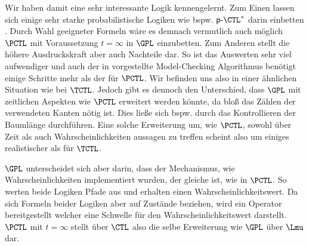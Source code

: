 Wir haben damit eine sehr interessante Logik kennengelernt.
Zum Einen lassen sich einige sehr starke probabilistische Logiken wie bspw. $\mathsf{p}\text{-}\CTL^*$ darin einbetten \cite{cleaveland2005probabilistic}.
Durch Wahl geeigneter Formeln wäre es demnach vermutlich auch möglich $\PCTL$ mit Voraussetzung $t=\infty$ in $\GPL$ einzubetten.
Zum Anderen stellt die höhere Ausdruckskraft aber auch Nachteile dar.
So ist das Auswerten sehr viel aufwendiger und auch der in \cite{cleaveland2005probabilistic} vorgestellte Model-Checking Algorithmus benötigt einige Schritte mehr als der für $\PCTL$.
Wir befinden uns also in einer ähnlichen Situation wie bei $\TCTL$.
Jedoch gibt es dennoch den Unterschied, dass $\GPL$ mit zeitlichen Aspekten wie $\PCTL$ erweitert werden könnte, da bloß das Zählen der verwendeten Kanten nötig ist.
Dies ließe sich bspw. durch das Kontrollieren der Baumlänge durchführen.
Eine solche Erweiterung um, wie $\PCTL$, sowohl über Zeit als auch Wahrscheinlichkeiten aussagen zu treffen scheint also um einiges realistischer als für $\TCTL$.

$\GPL$ unterscheidet sich aber darin, dass der Mechanismus, wie Wahrscheinlichkeiten implementiert wurden, der gleiche ist, wie in $\PCTL$.
So werten beide Logiken Pfade aus und erhalten einen Wahrscheinlichkeitswert.
Da sich Formeln beider Logiken aber auf Zustände beziehen, wird ein Operator bereitgestellt welcher eine Schwelle für den Wahrscheinlichkeitswert darstellt.
$\PCTL$ mit $t=\infty$ stellt über $\CTL$ also die selbe Erweiterung wie $\GPL$ über $\Lmu$ dar.













